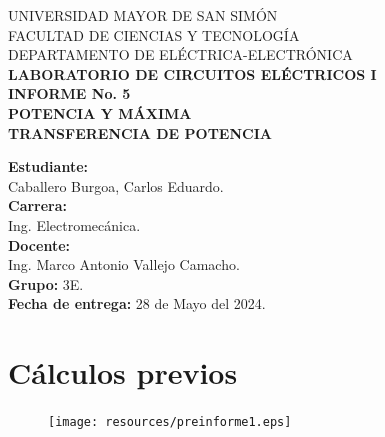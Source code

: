 \documentclass[letter,11pt]{article}
\begin{document}
\begin{titlepage}
    \begin{center}
        {\Large UNIVERSIDAD MAYOR DE SAN SIMÓN}\\
        \vspace*{0.15cm}
        {\large FACULTAD DE CIENCIAS Y TECNOLOGÍA}\\
        \vspace*{0.10cm}
        DEPARTAMENTO DE ELÉCTRICA-ELECTRÓNICA\\
        \vspace*{3.0cm}
        {\Large \textbf{LABORATORIO DE CIRCUITOS ELÉCTRICOS I}}\\
        \vspace*{0.3cm}
        {\Large \textbf{INFORME No. 5}}\\
        \vspace*{3.5cm}
        {\Large \textbf{POTENCIA Y MÁXIMA \\ TRANSFERENCIA DE POTENCIA}}\\
    \end{center}

    \vspace*{5.8cm}
    \leftskip=7.95cm
    \noindent
    \textbf{Estudiante:}\\
    Caballero Burgoa, Carlos Eduardo.\\
    \newline
    \textbf{Carrera:}\\
    Ing. Electromecánica.\\
    \newline
    \textbf{Docente:}\\
    Ing. Marco Antonio Vallejo Camacho.\\
    \newline
    \textbf{Grupo:} 3E.\\
    \textbf{Fecha de entrega:} 28 de Mayo del 2024.\\
\end{titlepage}

\section{Cálculos previos}

\vspace{2.0cm}
\begin{figure}[!h]
\centering
\texttt{[image: resources/preinforme1.eps]}
\end{figure}

\newpage
\end{document}
